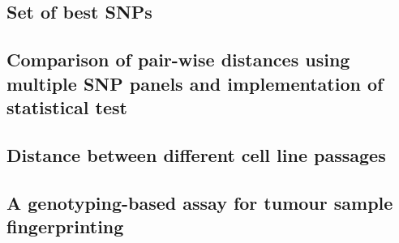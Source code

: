 	\subsection{Set of best SNPs}

	\subsection{Comparison of pair-wise distances using multiple SNP panels and implementation of statistical test}

	\subsection{Distance between different cell line passages}

	\subsection{A genotyping-based assay for tumour sample fingerprinting}
